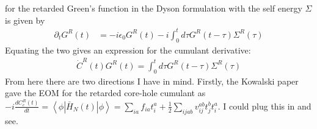 for the retarded Green's function in the Dyson formulation with the self energy $\Sigma$ is given by
\begin{align}
 \partial_t G^R(t)&=-i \epsilon _0 G^R(t)-i \int_0^t d \tau G^R(t-\tau) \Sigma^R(\tau)
\end{align}
Equating the two gives an expression for the cumulant derivative:
\begin{align}
\dot{C}^R(t)G^R(t) = \int_0^t d \tau G^R(t-\tau) \Sigma^R(\tau)
\end{align}
From here there are two directions I have in mind. Firstly, the Kowalski paper gave the EOM for the retarded core-hole cumulant as $-i\frac{d C_c^R(t)}{dt} = \left< \phi \left| \bar{H}_N(t) \right| \phi \right> = \sum_{ia} f_{ia} t_i^a + \frac{1}{2} \sum_{ijab} v_{ij}^{ab} t_j^b t_i^a$. I could plug this in and see.

